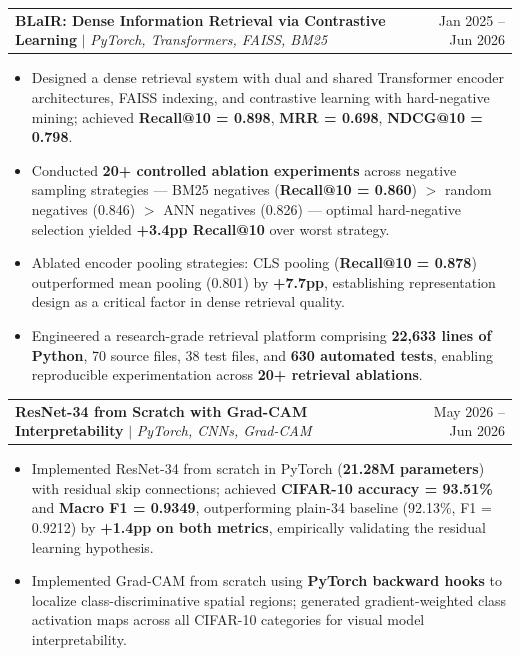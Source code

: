 \documentclass[letterpaper,11pt]{article}
\makeatletter
\newcommand{\resumeItem}[1]{
  \item\small{{#1 \vspace{-2pt}}}
}
\newcommand{\resumeProjectHeading}[2]{
    \item
    \begin{tabular*}{0.97\textwidth}{l@{\extracolsep{\fill}}r}
      \small#1 & #2 \\
    \end{tabular*}\vspace{-7pt}
}
\newcommand{\resumeItemListStart}{\begin{itemize}}
\newcommand{\resumeItemListEnd}{\end{itemize}\vspace{-5pt}}
\makeatother
\begin{document}
      \resumeProjectHeading
        {\textbf{BLaIR: Dense Information Retrieval via Contrastive Learning}
         $|$ \emph{PyTorch, Transformers, FAISS, BM25}}
        {Jan 2025 -- Jun 2026}
        \resumeItemListStart
          \resumeItem{Designed a dense retrieval system with dual and
            shared Transformer encoder architectures, FAISS indexing,
            and contrastive learning with hard-negative mining; achieved
            \textbf{Recall@10 = 0.898}, \textbf{MRR = 0.698},
            \textbf{NDCG@10 = 0.798}.}
          \resumeItem{Conducted \textbf{20+ controlled ablation
            experiments} across negative sampling strategies ---
            BM25 negatives (\textbf{Recall@10 = 0.860}) $>$ random
            negatives (0.846) $>$ ANN negatives (0.826) --- optimal
            hard-negative selection yielded \textbf{+3.4pp Recall@10}
            over worst strategy.}
          \resumeItem{Ablated encoder pooling strategies: CLS pooling
            (\textbf{Recall@10 = 0.878}) outperformed mean pooling
            (0.801) by \textbf{+7.7pp}, establishing representation
            design as a critical factor in dense retrieval quality.}
          \resumeItem{Engineered a research-grade retrieval platform
            comprising \textbf{22,633 lines of Python}, 70 source
            files, 38 test files, and \textbf{630 automated tests},
            enabling reproducible experimentation across
            \textbf{20+ retrieval ablations}.}
        \resumeItemListEnd

      \resumeProjectHeading
        {\textbf{ResNet-34 from Scratch with Grad-CAM Interpretability}
         $|$ \emph{PyTorch, CNNs, Grad-CAM}}
        {May 2026 -- Jun 2026}
        \resumeItemListStart
          \resumeItem{Implemented ResNet-34 from scratch in PyTorch
            (\textbf{21.28M parameters}) with residual skip connections;
            achieved \textbf{CIFAR-10 accuracy = 93.51\%} and
            \textbf{Macro F1 = 0.9349}, outperforming plain-34 baseline
            (92.13\%, F1 = 0.9212) by \textbf{+1.4pp on both metrics},
            empirically validating the residual learning hypothesis.}
          \resumeItem{Implemented Grad-CAM from scratch using
            \textbf{PyTorch backward hooks} to localize
            class-discriminative spatial regions; generated
            gradient-weighted class activation maps across all
            CIFAR-10 categories for visual model interpretability.}
        \resumeItemListEnd
\end{document}
